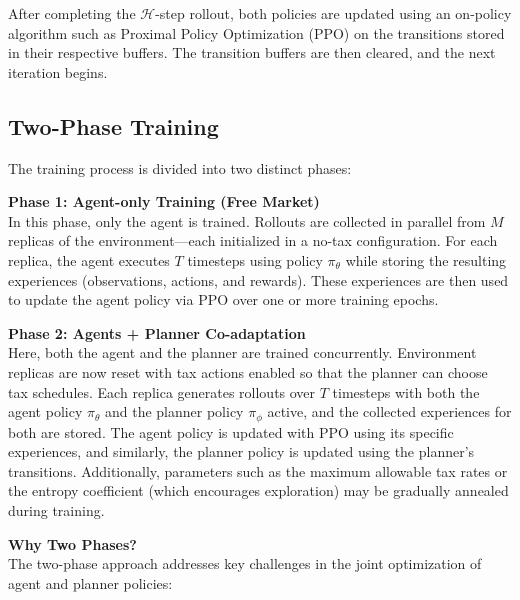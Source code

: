 After completing the \(\mathcal{H}\)-step rollout, both policies are updated using an on-policy algorithm such as Proximal Policy Optimization (PPO) on the transitions stored in their respective buffers. The transition buffers are then cleared, and the next iteration begins.

\subsection{Two-Phase Training}

The training process is divided into two distinct phases:

\textbf{Phase 1: Agent-only Training (Free Market)}\\[0.2cm]
In this phase, only the agent is trained. Rollouts are collected in parallel from \(M\) replicas of the environment—each initialized in a no-tax configuration. For each replica, the agent executes \(T\) timesteps using policy \(\pi_\theta\) while storing the resulting experiences (observations, actions, and rewards). These experiences are then used to update the agent policy via PPO over one or more training epochs.

\vspace{0.3cm}
\textbf{Phase 2: Agents + Planner Co-adaptation}\\[0.2cm]
Here, both the agent and the planner are trained concurrently. Environment replicas are now reset with tax actions enabled so that the planner can choose tax schedules. Each replica generates rollouts over \(T\) timesteps with both the agent policy \(\pi_\theta\) and the planner policy \(\pi_\phi\) active, and the collected experiences for both are stored. The agent policy is updated with PPO using its specific experiences, and similarly, the planner policy is updated using the planner’s transitions. Additionally, parameters such as the maximum allowable tax rates or the entropy coefficient (which encourages exploration) may be gradually annealed during training.

\textbf{Why Two Phases?}\\[0.2cm]
The two-phase approach addresses key challenges in the joint optimization of agent and planner policies:

